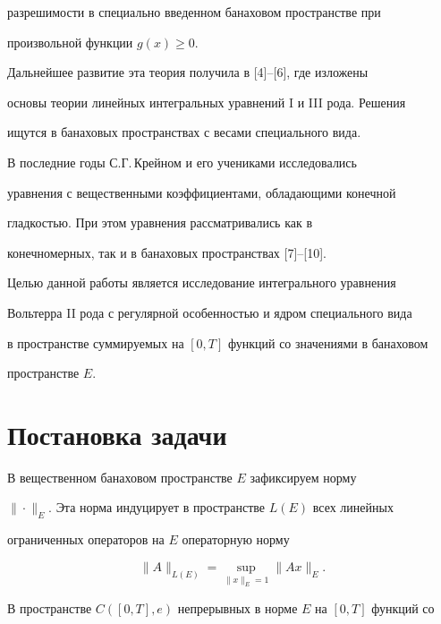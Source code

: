 разрешимости в специально введенном банаховом пространстве при 


произвольной функции $g(x)\ge0$. 


 


Дальнейшее развитие эта теория получила в [4]--[6], где изложены 


основы теории линейных интегральных уравнений I и III рода. Решения 


ищутся в банаховых пространствах с весами специального вида. 


 


В последние годы С.Г.\,Крейном и его учениками исследовались 


уравнения с вещественными коэффициентами, обладающими конечной 


гладкостью. При этом уравнения рассматривались как в 


конечномерных, так и в банаховых пространствах [7]--[10]. 


 


Целью данной работы является исследование интегрального уравнения 


Вольтерра II рода с регулярной особенностью и ядром специального вида 


в пространстве суммируемых на $[0,T]$ функций со значениями в банаховом 


пространстве $E$. 


 


\section{Постановка задачи} 


 


В вещественном банаховом пространстве $E$ зафиксируем норму 


$\|\cdot\|_E$. Эта норма индуцирует в пространстве $L(E)$ всех линейных 


ограниченных операторов на $E$ операторную норму 


$$ 


\|A\|_{L(E)}=\sup_{\|x\|_E=1}\|Ax\|_E. 


$$ 


 


В пространстве $C([0,T],e)$ непрерывных в норме $E$ на $[0,T]$ функций со 



